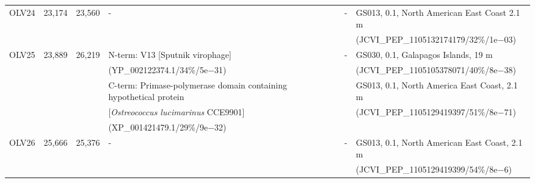 \begin{landscape}
\begin{longtable}{p{0.7cm}p{0.7cm}p{0.7cm}p{8cm}p{5cm}p{7cm}}
OLV24 & 23,174 & 23,560 & - & - & GS013, 0.1,  North American East Coast 2.1 m \\
 &  &  &  &  & (JCVI\_PEP\_1105132174179/32\%/1e$-$03) \\

OLV25 & 23,889 & 26,219 & N-term: V13 [Sputnik virophage] & - & GS030, 0.1, Galapagos Islands, 19 m   \\
 &  &  & (YP\_002122374.1/34\%/5e$-$31) &  & (JCVI\_PEP\_1105105378071/40\%/8e$-$38)  \\
 &  &  & C-term: Primase-polymerase domain containing hypothetical protein  &  & GS013, 0.1, North America East Coast, 2.1 m  \\
 &  &  & [\emph{Ostreococcus lucimarinus} CCE9901]  &  & (JCVI\_PEP\_1105129419397/51\%/8e$-$71) \\
 &  &  & (XP\_001421479.1/29\%/9e$-$32) &  &  \\

OLV26 & 25,666 & 25,376 & - & - & GS013, 0.1, North American East Coast, 2.1 m  \\
 &  &  &  &  & (JCVI\_PEP\_1105129419399/54\%/8e$-$6) \\

\end{longtable}
\endgroup
\end{landscape}

